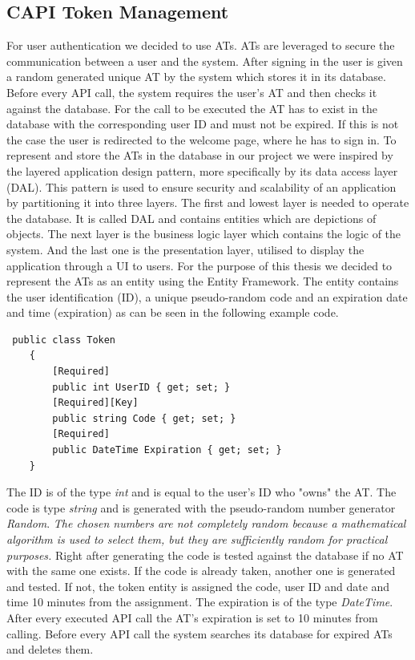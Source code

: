 \subsection{CAPI Token Management}
For user authentication we decided to use ATs. ATs are leveraged to secure the communication between a user and the system. After signing in the user is given a random generated unique AT by the system which stores it in its database. Before every API call, the system requires the user's AT and then checks it against the database. For the call to be executed the AT has to exist in the database with the corresponding user ID and must not be expired. If this is not the case the user is redirected to the welcome page, where he has to sign in. To represent and store the ATs in the database in our project we were inspired by the layered application design pattern, more specifically by its data access layer (DAL). This pattern is used to ensure security and scalability of an application by partitioning it into three layers. The first and lowest layer is needed to operate the database. It is called DAL and contains entities which are depictions of objects. The next layer is the business logic layer which contains the logic of the system. And the last one is the presentation layer, utilised to display the application through a UI to users. For the purpose of this thesis we decided to represent the ATs as an entity using the Entity Framework. The entity contains the user identification (ID), a unique pseudo-random code and an expiration date and time (expiration) as can be seen in the following example code. 
\lstset{style=sharpc, numbers=left}
\begin{lstlisting}
 public class Token
    {
        [Required]
        public int UserID { get; set; }
        [Required][Key]
        public string Code { get; set; }
        [Required]
        public DateTime Expiration { get; set; }
    }
\end{lstlisting}
The ID is of the type \textit{int} and is equal to the user's ID who "owns" the AT. The code is type \textit{string} and is generated with the pseudo-random number generator \textit{Random}. \textit{The chosen numbers are not completely random because a mathematical algorithm is used to select them, but they are sufficiently random for practical purposes.}\cite{msdn_documentation_system_random} Right after generating the code is tested against the database if no AT with the same one exists. If the code is already taken, another one is generated and tested. If not, the token entity is assigned the code, user ID and date and time 10 minutes from the assignment. The expiration is of the type \textit{DateTime}. After every executed API call the AT's expiration is set to 10 minutes from calling. 
Before every API call the system searches its database for expired ATs and deletes them. 

